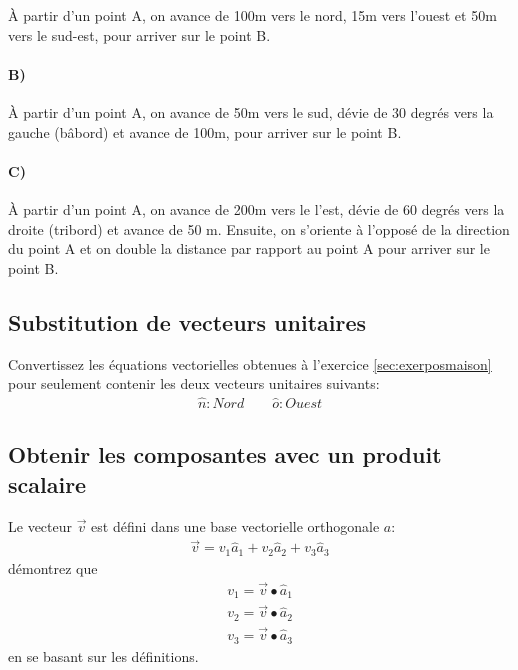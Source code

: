 À partir d'un point A, on avance de 100m vers le nord, 15m vers l'ouest et 50m vers le sud-est, pour arriver sur le point B.

\paragraph{B)}

À partir d'un point A, on avance de 50m vers le sud, dévie de 30 degrés vers la gauche (bâbord) et avance de 100m, pour arriver sur le point B.


\paragraph{C)}

À partir d'un point A, on avance de 200m vers le l'est, dévie de 60 degrés vers la droite (tribord) et avance de 50 m. Ensuite, on s'oriente à l'opposé de la direction du point A et on double la distance par rapport au point A pour arriver sur le point B.


\subsection{Substitution de vecteurs unitaires}

Convertissez les équations vectorielles obtenues à l’exercice \ref{sec:exerposmaison} pour seulement contenir les deux vecteurs unitaires suivants:
\begin{align}
	\hat{n} : Nord \quad\quad   \hat{o} : Ouest
\end{align}



\subsection{Obtenir les composantes avec un produit scalaire}

Le vecteur $\vec{v}$ est défini dans une base vectorielle orthogonale $a$:
\begin{align}
	\vec{v} = v_1 \hat{a}_1 + v_2 \hat{a}_2 + v_3 \hat{a}_3
\end{align}
démontrez que
\begin{align}
	v_1 = \vec{v} \bullet \hat{a}_1 \\
	v_2 = \vec{v} \bullet \hat{a}_2 \\
	v_3 = \vec{v} \bullet \hat{a}_3
\end{align}
en se basant sur les définitions.


